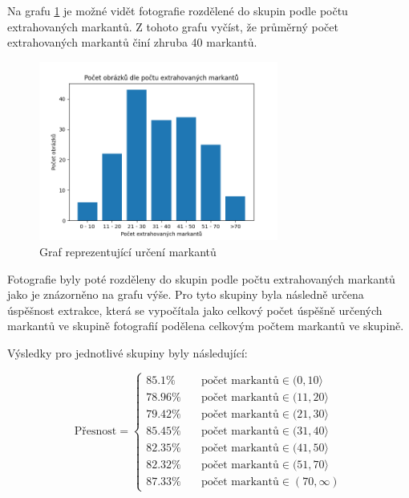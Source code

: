 Na grafu \ref{graph1} je možné vidět fotografie rozdělené do skupin podle počtu extrahovaných markantů. Z tohoto grafu vyčíst, že průměrný počet extrahovaných markantů činí zhruba 40 markantů. 


\begin{figure}[h]
	\centering
	\includegraphics[width=0.7\textwidth]{obrazky/graph1.png}
	\caption{Graf reprezentující určení markantů}
	\label{graph1}
\end{figure} 

Fotografie byly poté rozděleny do skupin podle počtu extrahovaných markantů jako je znázorněno na grafu výše. Pro tyto skupiny byla následně určena úspěšnost extrakce, která se vypočítala jako celkový počet úspěšně určených markantů ve skupině fotografií podělena celkovým počtem markantů ve skupině.

Výsledky pro jednotlivé skupiny byly následující:

\begin{equation}
    \text{Přesnost} = 
            \begin{cases}
                    85.1\% & \quad\text{počet markantů}  \in (0,10\rangle \\
                    78.96\% & \quad\text{počet markantů} \in (11,20\rangle \\
                    79.42\% & \quad\text{počet markantů} \in (21,30\rangle \\
                    85.45\% & \quad\text{počet markantů} \in (31,40\rangle \\ 
                    82.35\% & \quad\text{počet markantů}  \in (41,50\rangle \\ 
                    82.32\% & \quad\text{počet markantů}  \in (51,70\rangle \\ 
                    87.33\% & \quad\text{počet markantů}  \in (70, \infty)
            \end{cases}
\end{equation}

